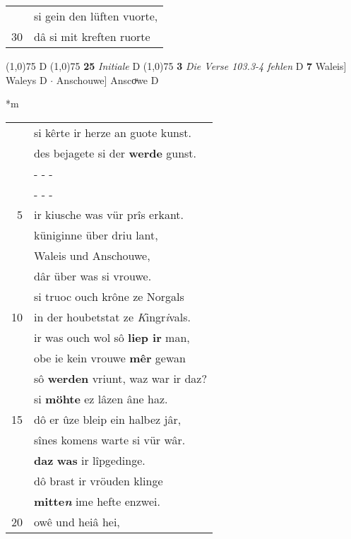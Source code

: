 \documentclass[8pt,a4paper,notitlepage]{article}
\begin{document}
\begin{table}[ht]
\begin{minipage}[t]{0.5\linewidth}
\begin{tabular}{rl}
 & si gein den lüften vuorte,\\ 
30 & dâ si mit kreften ruorte\\ 
\end{tabular}
\scriptsize
\line(1,0){75} \newline
D \newline
\line(1,0){75} \newline
\textbf{25} \textit{Initiale} D  \newline
\line(1,0){75} \newline
\textbf{3} \textit{Die Verse 103.3-4 fehlen} D  \textbf{7} Waleis] Waleys D  $\cdot$ Anschouwe] Anscoͮwe D \newline
\end{minipage}
\hspace{0.5cm}
\begin{minipage}[t]{0.5\linewidth}
\small
\begin{center}*m
\end{center}
\begin{tabular}{rl}
 & si kêrte ir herze an guote kunst.\\ 
 & des bejagete si der \textbf{werde} gunst.\\ 
 & \multicolumn{1}{l}{ - - - }\\ 
 & \multicolumn{1}{l}{ - - - }\\ 
5 & ir kiusche was vür prîs erkant.\\ 
 & küniginne über driu lant,\\ 
 & Waleis und Anschouwe,\\ 
 & dâr über was si vrouwe.\\ 
 & si truoc ouch krône ze Norgals\\ 
10 & in der houbetstat ze \textit{K}ingr\textit{i}vals.\\ 
 & ir was ouch wol sô \textbf{liep ir} man,\\ 
 & obe ie kein vrouwe \textbf{mêr} gewan\\ 
 & sô \textbf{werden} vriunt, waz war ir daz?\\ 
 & si \textbf{möhte} ez lâzen âne haz.\\ 
15 & dô er ûze bleip ein halbez jâr,\\ 
 & sînes komens warte si vür wâr.\\ 
 & \textbf{daz} \textbf{was} ir lîpgedinge.\\ 
 & dô brast ir vröuden klinge\\ 
 & \textbf{mitte\textit{n}} ime hefte enzwei.\\ 
20 & owê und heiâ hei,\\ 

\end{tabular}
\end{minipage}
\end{table}
\end{document}
